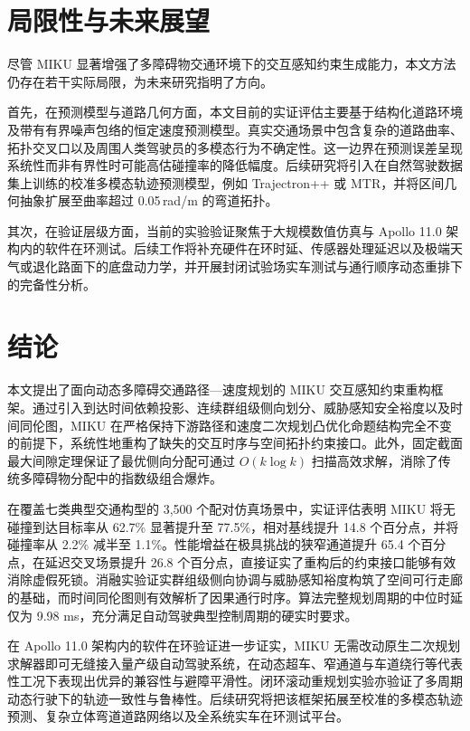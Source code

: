 \section{局限性与未来展望}
\label{zh:sec:limitations}

尽管 MIKU 显著增强了多障碍物交通环境下的交互感知约束生成能力，本文方法仍存在若干实际局限，为未来研究指明了方向。

首先，在预测模型与道路几何方面，本文目前的实证评估主要基于结构化道路环境及带有有界噪声包络的恒定速度预测模型。真实交通场景中包含复杂的道路曲率、拓扑交叉口以及周围人类驾驶员的多模态行为不确定性。这一边界在预测误差呈现系统性而非有界性时可能高估碰撞率的降低幅度。后续研究将引入在自然驾驶数据集上训练的校准多模态轨迹预测模型，例如 Trajectron++ 或 MTR，并将区间几何抽象扩展至曲率超过 0.05\,rad/m 的弯道拓扑。

其次，在验证层级方面，当前的实验验证聚焦于大规模数值仿真与 Apollo 11.0 架构内的软件在环测试。后续工作将补充硬件在环时延、传感器处理延迟以及极端天气或退化路面下的底盘动力学，并开展封闭试验场实车测试与通行顺序动态重排下的完备性分析。

\section{结论}
\label{zh:sec:conclusion}

本文提出了面向动态多障碍交通路径—速度规划的 MIKU 交互感知约束重构框架。通过引入到达时间依赖投影、连续群组级侧向划分、威胁感知安全裕度以及时间同伦图，MIKU 在严格保持下游路径和速度二次规划凸优化命题结构完全不变的前提下，系统性地重构了缺失的交互时序与空间拓扑约束接口。此外，固定截面最大间隙定理保证了最优侧向分配可通过 $O(k\log k)$ 扫描高效求解，消除了传统多障碍物分配中的指数级组合爆炸。

在覆盖七类典型交通构型的 3,500 个配对仿真场景中，实证评估表明 MIKU 将无碰撞到达目标率从 62.7\% 显著提升至 77.5\%，相对基线提升 14.8 个百分点，并将碰撞率从 2.2\% 减半至 1.1\%。性能增益在极具挑战的狭窄通道提升 65.4 个百分点，在延迟交叉场景提升 26.8 个百分点，直接证实了重构后的约束接口能够有效消除虚假死锁。消融实验证实群组级侧向协调与威胁感知裕度构筑了空间可行走廊的基础，而时间同伦图则有效解析了因果通行时序。算法完整规划周期的中位时延仅为 9.98 ms，充分满足自动驾驶典型控制周期的硬实时要求。

在 Apollo 11.0 架构内的软件在环验证进一步证实，MIKU 无需改动原生二次规划求解器即可无缝接入量产级自动驾驶系统，在动态超车、窄通道与车道绕行等代表性工况下表现出优异的兼容性与避障平滑性。闭环滚动重规划实验亦验证了多周期动态行驶下的轨迹一致性与鲁棒性。后续研究将把该框架拓展至校准的多模态轨迹预测、复杂立体弯道道路网络以及全系统实车在环测试平台。
